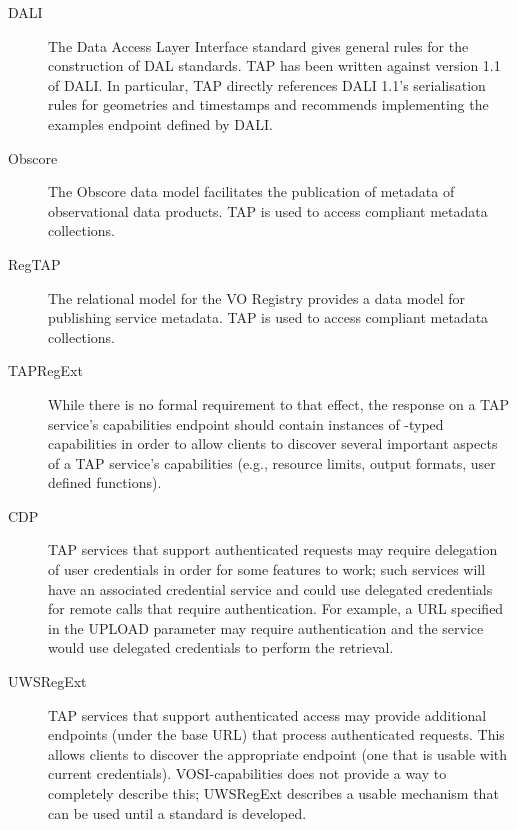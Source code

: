 \documentclass[11pt,letter]{ivoa}
\begin{document}
\begin{description}
\item[DALI \citep{std:DALI11}]  The Data Access Layer Interface standard
gives general rules for the construction of DAL standards.  TAP has been
written against version 1.1 of DALI.  In particular, TAP directly
references DALI 1.1's serialisation rules for geometries and timestamps
and recommends implementing the examples endpoint defined by DALI.

\item[Obscore \citep{2011ivoa.spec.1028T}] The Obscore data model
facilitates the publication of metadata of observational data products.
TAP is used to access compliant metadata collections.

\item[RegTAP \citep{2014ivoa.spec.1208D}]  The relational model for the
VO Registry provides a data model for publishing service metadata.
TAP is used to access compliant metadata collections.

\item[TAPRegExt \citep{2012ivoa.spec.0827D}] While there is no formal
requirement to that effect, the response on a TAP service's capabilities
endpoint should contain instances of -typed
capabilities in order to allow clients to discover several important
aspects of a TAP service's capabilities (e.g., resource limits, output
formats, user defined functions).

\item[CDP \citep{std:CDP}] TAP services that support authenticated requests may require 
delegation of user credentials in order for some features to work; such services
will have an associated credential service and could use delegated credentials for 
remote calls that require authentication. For example, a URL specified in the UPLOAD
parameter may require authentication and the service would use delegated credentials
to perform the retrieval.

\item[UWSRegExt \citep{note:UWSRegExt}] TAP services that support authenticated access may provide additional endpoints (under the base URL) that process authenticated requests. This allows clients to discover the appropriate endpoint (one that is usable with current credentials). VOSI-capabilities 
does not provide a way to completely describe this; UWSRegExt describes a usable mechanism that 
can be used until a standard is developed.
\end{description}
\end{document}
